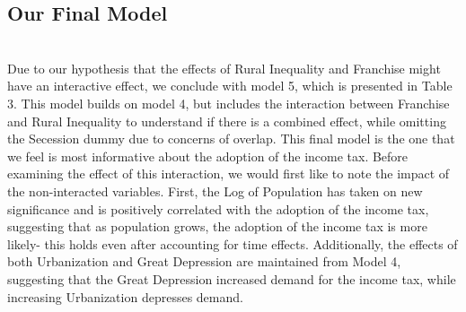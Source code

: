 \documentclass[letter, 12pt]{article}
\begin{document}
\subsection{Our Final Model}\hfill\\

Due to our hypothesis that the effects of Rural Inequality and Franchise might have an interactive effect, we conclude with model 5, which is presented in Table 3. This model builds on model 4, but includes the interaction between Franchise and Rural Inequality to understand if there is a combined effect, while omitting the Secession dummy due to concerns of overlap. This final model is the one that we feel is most informative about the adoption of the income tax. Before examining the effect of this interaction, we would first like to note the impact of the non-interacted variables. First, the Log of Population has taken on new significance and is positively correlated with the adoption of the income tax, suggesting that as population grows, the adoption of the income tax is more likely- this holds even after accounting for time effects. Additionally, the effects of both Urbanization and Great Depression are maintained from Model 4, suggesting that the Great Depression increased demand for the income tax, while increasing Urbanization depresses demand.
\end{document}
